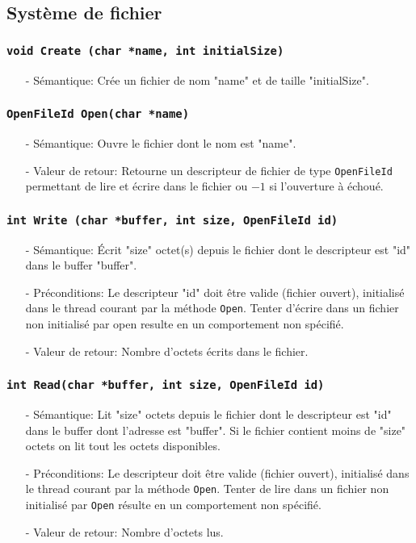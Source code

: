 \documentclass[11pt]{article}
\theoremstyle{definition}
\theoremstyle{definition}
\begin{document}
\subsection{Système de fichier}

\subsubsection{\texttt{void Create (char *name, int initialSize)}}
\begin{itemize}
\item[-]Sémantique: Crée un fichier de nom "name" et de taille "initialSize".
\end{itemize}

\subsubsection{\texttt{OpenFileId Open(char *name)}}
\begin{itemize}
\item[-]Sémantique: Ouvre le fichier dont le nom est "name". 
\item[-]Valeur de retour: Retourne un descripteur de fichier de type \texttt{OpenFileId}
  permettant de lire et écrire dans le fichier ou $-1$ si l'ouverture à échoué.
\end{itemize}

\subsubsection{\texttt{int Write (char *buffer, int size, OpenFileId id)}}
\begin{itemize}
\item[-]Sémantique: Écrit "size" octet(s) depuis le fichier dont le descripteur est "id"
  dans le buffer "buffer".
\item[-]Préconditions: Le descripteur "id" doit être valide (fichier ouvert), initialisé dans le thread courant
  par la méthode \texttt{Open}. Tenter d'écrire dans un fichier non initialisé par open resulte en un comportement non spécifié.
\item[-]Valeur de retour: Nombre d'octets écrits dans le fichier.
\end{itemize}

\subsubsection{\texttt{int Read(char *buffer, int size, OpenFileId id)}}
\begin{itemize}
\item[-]Sémantique: Lit "size" octets depuis le fichier dont le descripteur est "id" dans le buffer
  dont l'adresse est "buffer". Si le fichier contient moins de "size" octets on lit tout les octets disponibles.
\item[-]Préconditions: Le descripteur doit être valide (fichier ouvert), initialisé dans le thread courant
  par la méthode \texttt{Open}.
  Tenter de lire dans un fichier non initialisé par \texttt{Open} résulte en un comportement non spécifié.
\item[-]Valeur de retour: Nombre d'octets lus.
\end{itemize}
\end{document}
